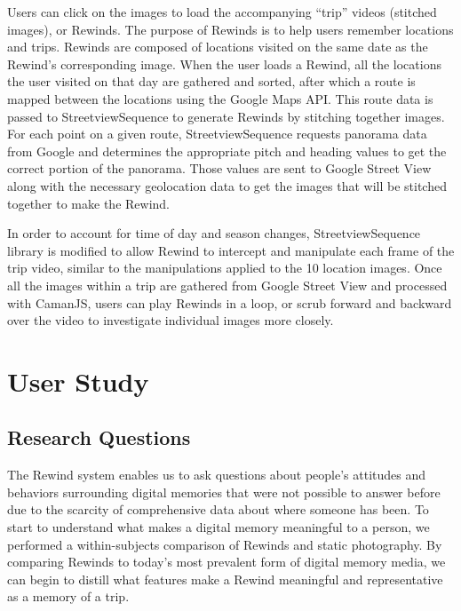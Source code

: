 \documentclass{sigchi}
\begin{document}

Users can click on the images to load the accompanying ``trip'' videos (stitched images), or Rewinds. The purpose of Rewinds is to help users remember locations and trips. Rewinds are composed of locations visited on the same date as the Rewind's corresponding image. When the user loads a Rewind, all the locations the user visited on that day are gathered and sorted, after which a route is mapped between the locations using the Google Maps API. This route data is passed to StreetviewSequence to generate Rewinds by stitching together images. For each point on a given route, StreetviewSequence requests panorama data from Google and determines the appropriate pitch and heading values to get the correct portion of the panorama. Those values are sent to Google Street View along with the necessary geolocation data to get the images that will be stitched together to make the Rewind.

In order to account for time of day and season changes, StreetviewSequence library is modified to allow Rewind to intercept and manipulate each frame of the trip video, similar to the manipulations applied to the 10 location images. Once all the images within a trip are gathered from Google Street View and processed with CamanJS, users can play Rewinds in a loop, or scrub forward and backward over the video to investigate individual images more closely.

\section{User Study}
\subsection{Research Questions}
The Rewind system enables us to ask questions about people's attitudes and behaviors surrounding digital memories that were not possible to answer before due to the scarcity of comprehensive data about where someone has been. To start to understand what makes a digital memory meaningful to a person, we performed a within-subjects comparison of Rewinds and static photography. By comparing Rewinds to today's most prevalent form of digital memory media, we can begin to distill what features make a Rewind meaningful and representative as a memory of a trip.
\end{document}
